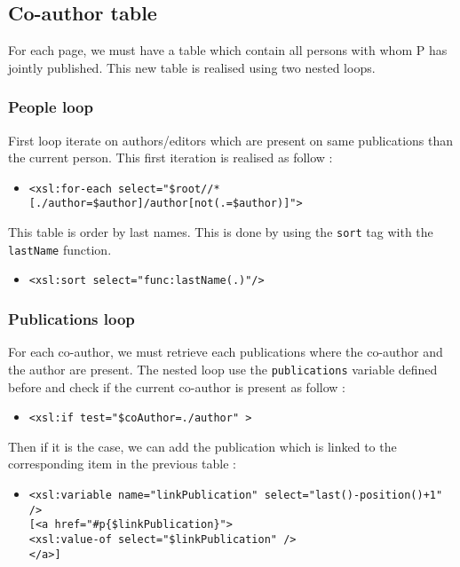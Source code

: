 \documentclass{article}
\begin{document}
\subsection{Co-author table}
For each page, we must have a table which contain all persons with whom P has jointly published. This new table is realised using two nested loops.

\subsubsection{People loop}
First loop iterate on authors/editors which are present on same publications than the current person. This first iteration is realised as follow :
\begin{itemize}
\item \begin{verbatim}
<xsl:for-each select="$root//*[./author=$author]/author[not(.=$author)]">
\end{verbatim}
\end{itemize}
This table is order by last names. This is done by using the \verb|sort| tag with the \verb|lastName| function.
\begin{itemize}
\item \verb|<xsl:sort select="func:lastName(.)"/>|
\end{itemize}
\subsubsection{Publications loop}
For each co-author, we must retrieve each publications where the co-author and the author are present. The nested loop use the \verb|publications| variable defined before and check if the current co-author is present as follow : 
\begin{itemize}
\item \verb|<xsl:if test="$coAuthor=./author" >|
\end{itemize}
Then if it is the case, we can add the publication which is linked to the corresponding item in the previous table :
\begin{itemize}
\item \begin{verbatim}
<xsl:variable name="linkPublication" select="last()-position()+1" />
[<a href="#p{$linkPublication}">
<xsl:value-of select="$linkPublication" />
</a>]
\end{verbatim}
\end{itemize}
\end{document}
